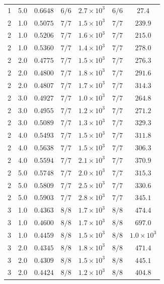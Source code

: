 \begin{tabular}{cc c cc cc}
        1 & 5.0 & $0.6648$ & $6/6$ & $2.7 \times 10^{3}$ & $6/6$ & $27.4$ \\
        2 & 1.0 & $0.5075$ & $7/7$ & $1.5 \times 10^{3}$ & $7/7$ & $239.9$ \\
        2 & 1.0 & $0.5206$ & $7/7$ & $1.6 \times 10^{3}$ & $7/7$ & $215.0$ \\
        2 & 1.0 & $0.5360$ & $7/7$ & $1.4 \times 10^{3}$ & $7/7$ & $278.0$ \\
        2 & 2.0 & $0.4775$ & $7/7$ & $1.5 \times 10^{3}$ & $7/7$ & $276.3$ \\
        2 & 2.0 & $0.4800$ & $7/7$ & $1.8 \times 10^{3}$ & $7/7$ & $291.6$ \\
        2 & 2.0 & $0.4807$ & $7/7$ & $1.7 \times 10^{3}$ & $7/7$ & $314.3$ \\
        2 & 3.0 & $0.4927$ & $7/7$ & $1.0 \times 10^{3}$ & $7/7$ & $264.8$ \\
        2 & 3.0 & $0.4955$ & $7/7$ & $1.2 \times 10^{3}$ & $7/7$ & $271.2$ \\
        2 & 3.0 & $0.5089$ & $7/7$ & $1.3 \times 10^{3}$ & $7/7$ & $329.3$ \\
        2 & 4.0 & $0.5493$ & $7/7$ & $1.5 \times 10^{3}$ & $7/7$ & $311.8$ \\
        2 & 4.0 & $0.5638$ & $7/7$ & $1.5 \times 10^{3}$ & $7/7$ & $306.3$ \\
        2 & 4.0 & $0.5594$ & $7/7$ & $2.1 \times 10^{3}$ & $7/7$ & $370.9$ \\
        2 & 5.0 & $0.5748$ & $7/7$ & $2.0 \times 10^{3}$ & $7/7$ & $315.3$ \\
        2 & 5.0 & $0.5809$ & $7/7$ & $2.5 \times 10^{3}$ & $7/7$ & $330.6$ \\
        2 & 5.0 & $0.5903$ & $7/7$ & $2.8 \times 10^{3}$ & $7/7$ & $345.1$ \\
        3 & 1.0 & $0.4363$ & $8/8$ & $1.7 \times 10^{3}$ & $8/8$ & $474.4$ \\
        3 & 1.0 & $0.4600$ & $8/8$ & $1.7 \times 10^{3}$ & $8/8$ & $697.0$ \\
        3 & 1.0 & $0.4459$ & $8/8$ & $1.5 \times 10^{3}$ & $8/8$ & $1.0 \times 10^{3}$ \\
        3 & 2.0 & $0.4345$ & $8/8$ & $1.8 \times 10^{3}$ & $8/8$ & $471.4$ \\
        3 & 2.0 & $0.4309$ & $8/8$ & $1.5 \times 10^{3}$ & $8/8$ & $445.1$ \\
        3 & 2.0 & $0.4424$ & $8/8$ & $1.2 \times 10^{3}$ & $8/8$ & $404.8$ \\

\end{tabular}
